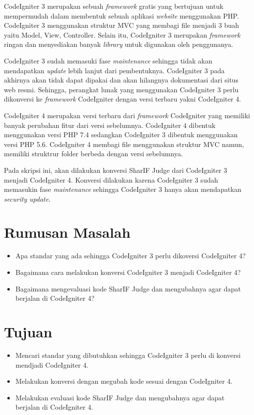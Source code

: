 CodeIgniter 3 merupakan sebuah \textit{framework} gratis yang bertujuan untuk mempermudah dalam membentuk sebuah aplikasi \textit{website} menggunakan PHP. CodeIgniter 3 menggunakan struktur MVC yang membagi file menjadi 3 buah yaitu Model, View, Controller. Selain itu, CodeIgniter 3 merupakan \textit{framework} ringan dan menyediakan banyak \textit{library} untuk digunakan oleh penggunanya. 

CodeIgniter 3 sudah memasuki fase \textit{maintenance} sehingga tidak akan mendapatkan \textit{update} lebih lanjut dari pembentuknya. CodeIgniter 3 pada akhirnya akan tidak dapat dipakai dan akan hilangnya dokumentasi dari situs web resmi. Sehingga, perangkat lunak yang menggunakan CodeIgniter 3 perlu dikonversi ke \textit{framework} CodeIgniter dengan versi terbaru yakni CodeIgniter 4.

CodeIgniter 4 merupakan versi terbaru dari \textit{framework} CodeIgniter yang memiliki banyak perubahan fitur dari versi sebelumnya. CodeIgniter 4 dibentuk menggunakan versi PHP 7.4 sedangkan CodeIgniter 3 dibentuk menggunakan versi PHP 5.6. CodeIgniter 4 membagi file menggunakan struktur MVC namun, memiliki struktrur folder berbeda dengan versi sebelumnya.

Pada skripsi ini, akan dilakukan konversi SharIF Judge dari CodeIgniter 3 menjadi CodeIgniter 4. Konversi dilakukan karena CodeIgniter 3 sudah memasukin fase \textit{maintenance} sehingga CodeIgniter 3 hanya akan mendapatkan \textit{security update}.

\section{Rumusan Masalah}
\label{sec:rumusan}
\begin{itemize}
\item Apa standar yang ada sehingga CodeIgniter 3 perlu dikoversi CodeIgniter 4?
	\item Bagaimana cara melakukan konversi CodeIgniter 3 menjadi CodeIgniter 4?
	\item Bagaimana mengevaluasi kode SharIF Judge dan mengubahnya agar dapat berjalan di CodeIgniter 4?
\end{itemize}
\section{Tujuan}
\label{sec:tujuan}
\begin{itemize}
	\item Mencari standar yang dibutuhkan sehingga CodeIgniter 3 perlu di konversi mendjadi CodeIgniter 4.
	\item Melakukan konversi dengan megubah kode sesuai dengan CodeIgniter 4.
	\item Melakukan evaluasi kode SharIF Judge dan mengubahnya agar dapat berjalan di CodeIgniter 4.
\end{itemize}

